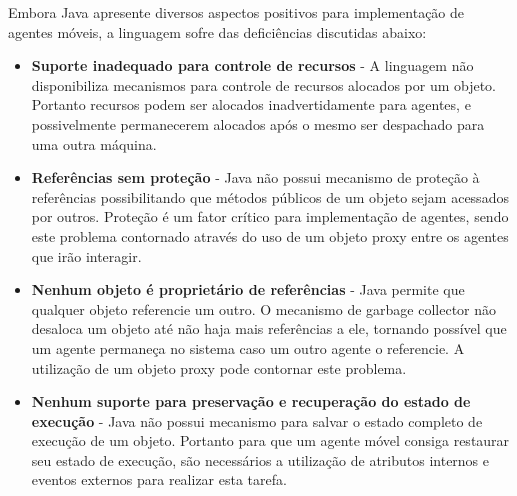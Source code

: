 Embora Java apresente diversos aspectos positivos para implementação de agentes móveis, a linguagem sofre das deficiências discutidas abaixo: 

\begin{itemize}
	\item \textbf{Suporte inadequado para controle de recursos} - A linguagem não disponibiliza mecanismos para controle de recursos alocados por um objeto. Portanto recursos podem ser alocados inadvertidamente para agentes, e possivelmente permanecerem alocados após o mesmo ser despachado para uma outra máquina.

	\item \textbf{Referências sem proteção} - Java não possui mecanismo de proteção à referências possibilitando que métodos públicos de um objeto sejam acessados por outros. Proteção é um fator crítico para implementação de agentes, sendo este problema contornado através do uso de um objeto proxy entre os agentes que irão interagir.

	\item \textbf{Nenhum objeto é proprietário de referências} - Java permite que qualquer objeto referencie um outro. O mecanismo de garbage collector não desaloca um objeto até não haja mais referências a ele, tornando possível que um agente permaneça no sistema caso um outro agente o referencie. A utilização de um objeto proxy pode contornar este problema.

	\item \textbf{Nenhum suporte para preservação e recuperação do estado de execução} - Java não possui mecanismo para salvar o estado completo de execução de um objeto. Portanto para que um agente móvel consiga restaurar seu estado de execução, são necessários a utilização de atributos internos e eventos externos para realizar esta tarefa. 
\end{itemize}
\cite{Aulas}